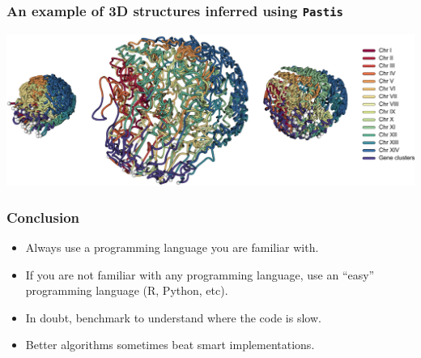 \documentclass[xcolor=dvipsnames]{beamer}
\begin{document}
\begin{frame}
\frametitle{An example of 3D structures inferred using \texttt{Pastis}}
\includegraphics[width=\linewidth]{images/3D_var_genes.png}
\end{frame}

\begin{frame}
\frametitle{Conclusion}
\begin{itemize}[label={$\bullet$}]
\item Always use a programming language you are familiar with.
\item If you are not familiar with any programming language, use an ``easy''
programming language (R, Python, etc).
\item In doubt, benchmark to understand where the code is slow.
\item Better algorithms sometimes beat smart implementations.
\end{itemize}
\end{frame}
\end{document}
